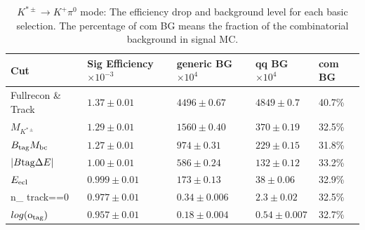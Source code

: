 \begin{table}[ht]
 \small
\begin{center}
\begin{tabular}{ |p{2.2cm}||p{3.6cm}||p{2.8cm}||p{2.1cm}||p{1.3cm}|| }
 \hline
 Cut						& Sig Efficiency$\times10^{-3}$  & generic BG$\times10^{4}$&qq BG$\times10^{4}$& com BG \\
\hline
\hline
  Fullrecon \& Track 			& $1.37 \pm 0.01$ 	& $ 4496\pm0.67 $ 	&  $ 4849 \pm0.7$& 40.7\% \\ %
 \hline
  $ M_{K^{* \pm}}  $  				& $1.29\pm 0.01$  	& $ 1560\pm0.40 $	& $ 370\pm0.19 $ & 32.5\%\\ %
  \hline
 $B_{\rm{tag}}M_{\rm{bc}} $  			& $1.27\pm 0.01$ 	& $ 974\pm0.31$		& $ 229\pm0.15 $ &31.8\%\\ %
 \hline
 $ | B{\rm{tag}}\Delta E | $  			& $1.00\pm 0.01$	& $ 586 \pm0.24$	& $ 132\pm0.12 $ &33.2\%\\ %
 \hline
 $E_{\rm{ecl}} $				& $0.999\pm 0.01 $	& $ 173\pm0.13$		& $ 38\pm0.06 $ &32.9\%\\ %
 \hline
 n\_ track==0 					& $0.977\pm 0.01 $	& $0.34\pm0.006$ 	& $2.3\pm0.02$  &32.5\%\\ %
 \hline		
$log(\rm{o_{tag}})$ 				& $0.957\pm 0.01 $	& $0.18\pm0.004$	& $0.54\pm0.007$ &32.7\% \\ %
 \hline
\end{tabular}
\caption{$K^{*\pm} \rightarrow K^+ \pi^0$ mode: The efficiency drop and background level for each basic selection. The percentage of com BG means the fraction of the combinatorial background in signal MC. } \label{t:efficiency_kpi0}
\end{center}
\end{table}
